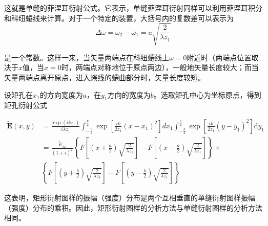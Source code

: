 \documentclass[UTF8]{ctexart}
\begin{document}
\noindent 这就是单缝的菲涅耳衍射公式。它表示，单缝菲涅耳衍射同样可以利用菲涅耳积分和科纽蜷线来计算。对于一个特定的装置，大括号内的复数差可以表示为
\begin{equation}
	\Delta \omega=\omega_{2}-\omega_{1}=a \sqrt{\frac{2}{\lambda z_{1}}}
\end{equation}

\noindent 是一个常数。这样一来，当矢量两端点在科纽蜷线上$ \omega = 0 $附近时（两端点位置取决于$ x $值，当$ x = 0 $时，两端点对称地位于原点两边），一般地矢量长度较大；而当矢量两端点离开原点，进入蜷线的蜷曲部分时，矢量长度较短。

	设矩孔在$ x_{1} $的方向宽度为$ a $，在$ y_{1} $方向的宽度为$ b $。选取矩孔中心为坐标原点，得到矩孔衍射公式
	
	\begin{equation}
	\begin{aligned}
	\tilde{\boldsymbol{E}}(x, y)&=\frac{\exp \left(i k z_{1}\right)}{i \lambda z_{1}} \int_{-\frac{a}{2}}^{\frac{\pi}{2}} \exp \left[\frac{i k}{2 z_{1}}\left(x-x_{1}\right)^{2}\right] d x_{1} \int_{-\frac{b}{2}}^{\frac{b}{2}} \exp \left[\frac{i k}{2 z_{1}}\left(y-y_{1}\right)^{2}\right] \mathrm{d} y_{1}
	\\
	&=\frac{\tilde{E}_{\infty}}{(1+i)^{2}}\left\{F\left[\left(x+\frac{a}{2}\right) \sqrt{\frac{2}{\lambda z_{1}}}\right]-F\left[\left(x-\frac{a}{2}\right) \sqrt{\frac{2}{\lambda z_{1}}}\right]\right\} \times 
	\\
	&\left\{F\left[\left(y+\frac{b}{2}\right) \sqrt{\frac{2}{\lambda z_{1}}}\right]-F\left[\left(y-\frac{b}{2}\right) \sqrt{\frac{2}{\lambda z_{1}}}\right]\right\}
	\end{aligned}
	\end{equation}
	
\noindent 这表明，矩形衍射图样的振幅（强度）分布是两个互相垂直的单缝衍射图样振幅（强度）分布的乘积。因此，矩形衍射图样的分析方法与单缝衍射图样的分析方法相同。
\end{document}
